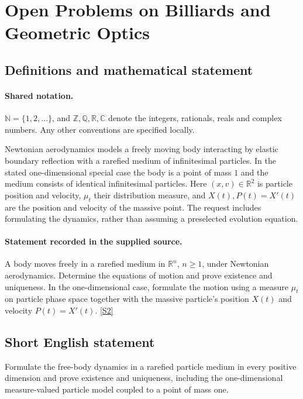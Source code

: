 \documentclass[11pt]{article}
\newcommand{\sref}[2]{\hyperlink{source:#1:#2}{[S#2]}}
\begin{document}
\section{Open Problems on Billiards and Geometric Optics}\label{statement}

\subsection{Definitions and mathematical statement}

\paragraph{Shared notation.}$\mathbb N=\{1,2,\ldots\}$, and $\mathbb Z,\mathbb Q,\mathbb R,\mathbb C$ denote the integers, rationals, reals and complex numbers. Any other conventions are specified locally.


Newtonian aerodynamics models a freely moving body interacting by elastic boundary reflection with a rarefied medium of infinitesimal particles. In the stated one-dimensional special case the body is a point of mass $1$ and the medium consists of identical infinitesimal particles. Here $(x,v)\in\mathbb R^2$ is particle position and velocity, $\mu_t$ their distribution measure, and $X(t),P(t)=X\prime(t)$ are the position and velocity of the massive point. The request includes formulating the dynamics, rather than assuming a preselected evolution equation.
\paragraph{Statement recorded in the supplied source.}
A body moves freely in a rarefied medium in $\mathbb{R}^n$, $n\geq1$, under Newtonian aerodynamics. Determine the equations of motion and prove existence and uniqueness. In the one-dimensional case, formulate the motion using a measure $\mu_t$ on particle phase space together with the massive particle's position $X(t)$ and velocity $P(t)=X'(t)$. \sref{statement}{2}
\subsection{Short English statement}
Formulate the free-body dynamics in a rarefied particle medium in every positive dimension and prove existence and uniqueness, including the one-dimensional measure-valued particle model coupled to a point of mass one.
\end{document}
